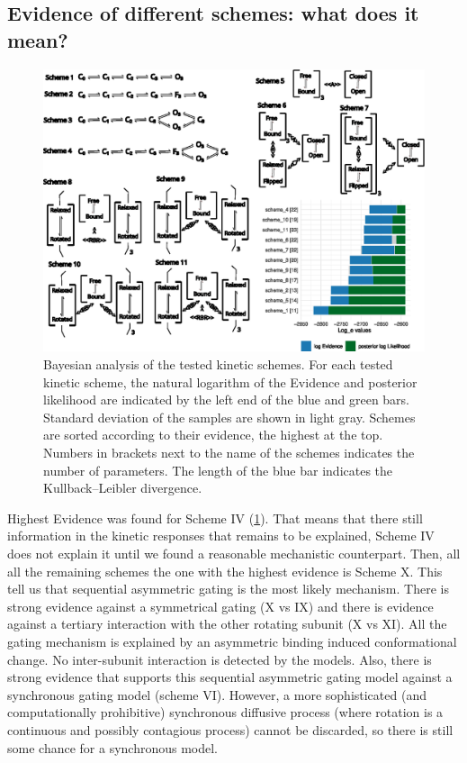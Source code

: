 \documentclass[pdflatex,sn-mathphys-num]{sn-jnl}%
\theoremstyle{thmstyleone}%
\theoremstyle{thmstyletwo}%
\theoremstyle{thmstylethree}%
\begin{document}
\subsection{Evidence of different schemes: what does it mean?}
\begin{figure}[h]
\centering
\includegraphics[width=1.0\textwidth]{Figure_1.eps}
\caption{Bayesian analysis of the tested kinetic schemes. For each tested kinetic scheme, the natural logarithm of the Evidence and posterior likelihood are indicated by the left end of the blue and green bars. Standard deviation of the samples are shown in light gray. Schemes are sorted according to their evidence, the highest at the top. Numbers in brackets next to the name of the schemes indicates the number of parameters. The length of the blue bar indicates the Kullback–Leibler divergence. }\label{fig_evidences}
\end{figure}



Highest Evidence was found for Scheme IV (\ref{fig_evidences}). That means that there still information in the kinetic responses that remains to be explained, Scheme IV does not explain it until we found a reasonable mechanistic counterpart. 
Then, all all the remaining schemes the one with the highest evidence is Scheme X. This tell us that sequential asymmetric gating is the most likely mechanism. There is strong evidence against a symmetrical gating (X vs IX) and there is evidence against a tertiary interaction with the other rotating subunit (X vs XI). All the gating mechanism is explained by an asymmetric binding induced conformational change. No inter-subunit interaction is detected by the models. 
Also, there is strong evidence that supports this sequential asymmetric gating model against a synchronous gating model (scheme VI). 
However, a more sophisticated (and computationally prohibitive) synchronous diffusive process (where rotation is a continuous and possibly contagious process) cannot be discarded, so there is still some chance for a synchronous model. 
\end{document}
